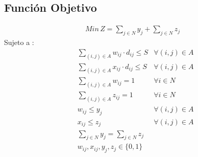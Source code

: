 \documentclass[final]{article}
\numberwithin{equation}{subsection}
\begin{document}
\subsection{Función Objetivo}
\begin{equation}
\label{Fo}
\begin{split}
Min\,Z =	\sum_{j \in N} y_{j} + \sum_{j \in N} z_{j}
\end{split}
\end{equation}
Sujeto a : 
\begin{align}
& \sum_{(i,j) \in A} w_{ij} \cdot d_{ij} \leq S & \forall (i,j) \in A \\
& \sum_{(i,j) \in A} x_{ij} \cdot d_{ij} \leq S & \forall (i,j) \in A \\
& \sum_{(i,j) \in A} w_{ij} = 1 & \forall i \in N \\
& \sum_{(i,j) \in A} z_{ij} = 1 & \forall i \in N \\
& w_{ij} \leq  y_{j} & \forall (i,j) \in A \\
& x_{ij} \leq  z_{j} & \forall (i,j) \in A \\
& \sum_{j \in N} y_{j} = \sum_{j \in N} z_{j}\\
& w_{ij}, x_{ij}, y_{j}, z_{j} \in \{0,1\}
\end{align}
\end{document}
